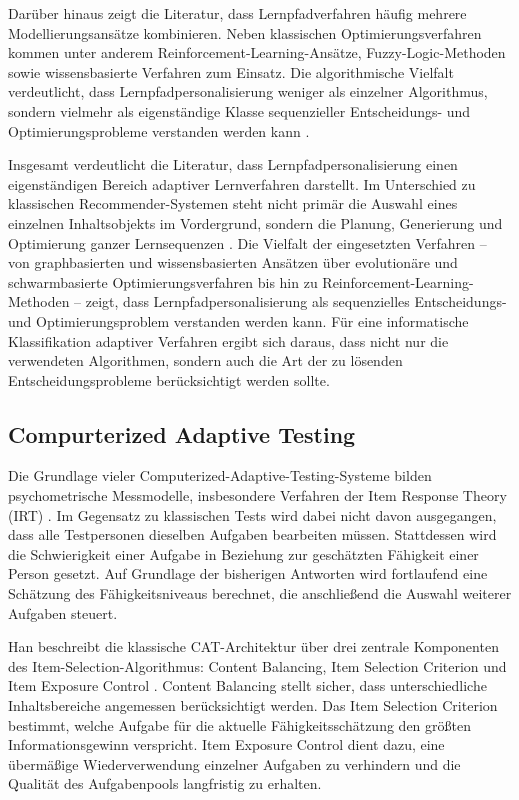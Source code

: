 Darüber hinaus zeigt die Literatur, dass Lernpfadverfahren häufig
mehrere Modellierungsansätze kombinieren. Neben klassischen
Optimierungsverfahren kommen unter anderem
Reinforcement-Learning-Ansätze, Fuzzy-Logic-Methoden sowie
wissensbasierte Verfahren zum Einsatz. Die algorithmische Vielfalt
verdeutlicht, dass Lernpfadpersonalisierung weniger als einzelner
Algorithmus, sondern vielmehr als eigenständige Klasse sequenzieller
Entscheidungs- und Optimierungsprobleme verstanden werden kann
\citep{Nabizadeh2020}.

Insgesamt verdeutlicht die Literatur, dass Lernpfadpersonalisierung
einen eigenständigen Bereich adaptiver Lernverfahren darstellt. Im
Unterschied zu klassischen Recommender-Systemen steht nicht primär die
Auswahl eines einzelnen Inhaltsobjekts im Vordergrund, sondern die
Planung, Generierung und Optimierung ganzer Lernsequenzen
\citep{Nabizadeh2020}. Die Vielfalt der eingesetzten Verfahren -- von
graphbasierten und wissensbasierten Ansätzen über evolutionäre und
schwarmbasierte Optimierungsverfahren bis hin zu
Reinforcement-Learning-Methoden -- zeigt, dass Lernpfadpersonalisierung
als sequenzielles Entscheidungs- und Optimierungsproblem verstanden
werden kann. Für eine informatische Klassifikation adaptiver Verfahren
ergibt sich daraus, dass nicht nur die verwendeten Algorithmen, sondern
auch die Art der zu lösenden Entscheidungsprobleme berücksichtigt werden
sollte.

\subsection{Compurterized Adaptive
Testing}\label{compurterized-adaptive-testing}

Die Grundlage vieler Computerized-Adaptive-Testing-Systeme bilden
psychometrische Messmodelle, insbesondere Verfahren der Item Response
Theory (IRT) \citep{Han2018, Liu2024}. Im Gegensatz zu klassischen Tests
wird dabei nicht davon ausgegangen, dass alle Testpersonen dieselben
Aufgaben bearbeiten müssen. Stattdessen wird die Schwierigkeit einer
Aufgabe in Beziehung zur geschätzten Fähigkeit einer Person gesetzt. Auf
Grundlage der bisherigen Antworten wird fortlaufend eine Schätzung des
Fähigkeitsniveaus berechnet, die anschließend die Auswahl weiterer
Aufgaben steuert.

Han beschreibt die klassische CAT-Architektur über drei zentrale
Komponenten des Item-Selection-Algorithmus: Content Balancing, Item
Selection Criterion und Item Exposure Control \citep{Han2018}. Content
Balancing stellt sicher, dass unterschiedliche Inhaltsbereiche
angemessen berücksichtigt werden. Das Item Selection Criterion bestimmt,
welche Aufgabe für die aktuelle Fähigkeitsschätzung den größten
Informationsgewinn verspricht. Item Exposure Control dient dazu, eine
übermäßige Wiederverwendung einzelner Aufgaben zu verhindern und die
Qualität des Aufgabenpools langfristig zu erhalten.

